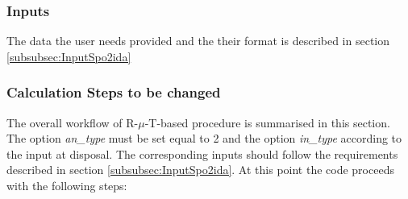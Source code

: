 \subsubsection{Inputs}
The data the user needs provided and the their format is described in section \ref{subsubsec:InputSpo2ida}

\subsubsection{Calculation Steps to be changed} 
The overall workflow of R-$\mu$-T-based procedure is summarised in this section. The option \textit{an\_type} must be set equal to 2 and the option \textit{in\_type} according to the input at disposal. The corresponding inputs should follow the requirements described in section \ref{subsubsec:InputSpo2ida}. At this point the code proceeds with the following steps:

